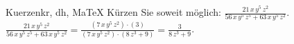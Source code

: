 \begin{MAufgabe}{Kuerzen}{kr, dh, MaTeX}
K\"urzen Sie soweit m\"oglich: $\frac{21\, x\, y^5\, z^2}{56\, x\, y^5\, z^5 + 63\, x\, y^5\, z^2}$.\\ 
\ifLsg\MLoesung
\quad $\frac{21\, x\, y^5\, z^2}{56\, x\, y^5\, z^5 + 63\, x\, y^5\, z^2}=\frac{(7\, x\, y^5\, z^2)\cdot(3)}{(7\, x\, y^5\, z^2)\cdot(8\, z^3 + 9)}=\frac{3}{8\, z^3 + 9}$.\else\relax\fi
 \end{MAufgabe}